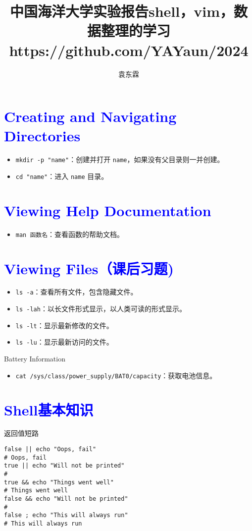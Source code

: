 \documentclass{article}
\begin{document}
\title{中国海洋大学实验报告}
\maketitle
\title{shell，vim，数据整理的学习\\https://github.com/YAYaun/2024\\}
\author{袁东霖}
\maketitle
\section{\textcolor{blue}{Creating and Navigating Directories}}
\begin{itemize}
    \item \texttt{mkdir -p "name"}：创建并打开 \texttt{name}，如果没有父目录则一并创建。
    \item \texttt{cd "name"}：进入 \texttt{name} 目录。
\end{itemize}

\section{\textcolor{blue}{Viewing Help Documentation}}
\begin{itemize}
    \item \texttt{man 函数名}：查看函数的帮助文档。
\end{itemize}

\section{\textcolor{blue}{Viewing Files（课后习题)}}
\begin{itemize}
    \item \texttt{ls -a}：查看所有文件，包含隐藏文件。
    \item \texttt{ls -lah}：以长文件形式显示，以人类可读的形式显示。
    \item \texttt{ls -lt}：显示最新修改的文件。
    \item \texttt{ls -lu}：显示最新访问的文件。
\end{itemize}{{Battery Information}}
\begin{itemize}
    \item \texttt{cat /sys/class/power\_supply/BAT0/capacity}：获取电池信息。
\end{itemize}
\section{\textcolor{blue}{Shell基本知识}}
返回值短路
\begin{lstlisting}
false || echo "Oops, fail"
# Oops, fail
true || echo "Will not be printed"
#
true && echo "Things went well"
# Things went well
false && echo "Will not be printed"
#
false ; echo "This will always run"
# This will always run
\end{lstlisting}
\end{document}

